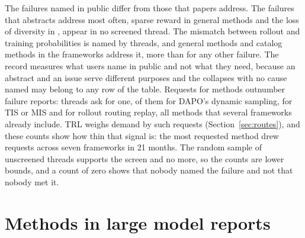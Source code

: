 \documentclass{article}
\begin{document}
\begin{table}[!htbp]
\centering
\small
\caption{\textbf{Training failures in the frameworks' issues against the methods that address them.} Unit: thread in the first column, general method in the next two, catalog method in the last. Issue threads are issues and discussions opened since January 2025 with an opening post that reports the failure. General methods naming the failure are the pool's general methods with an abstract that names it, with the number of those that at least one framework includes. Catalog methods are those addressing the failure that at least one framework includes. The two rows with dashes are failures outside the catalog's list.}
\label{tab:demand}

\end{table}

The failures named in public differ from those that papers address. The failures that abstracts address most often, sparse reward in \NSupplySparseReward{} general methods and the loss of diversity in \NSupplyDiversityLoss{}, appear in no screened thread. The mismatch between rollout and training probabilities is named by \NIssueTrainInferMismatch{} threads, and \NSupplyTrainInferMismatch{} general methods and \NCatalogTrainInferMismatch{} catalog methods in the frameworks address it, more than for any other failure. The record measures what users name in public and not what they need, because an abstract and an issue serve different purposes and the \NIssueInstability{} collapses with no cause named may belong to any row of the table. Requests for methods outnumber failure reports: \NIssueRequest{} threads ask for one, \NReqDynamicSampling{} of them for DAPO's dynamic sampling, \NReqMismatch{} for TIS or MIS and \NReqRoutingReplay{} for rollout routing replay, all methods that several frameworks already include. TRL weighs demand by such requests (Section~\ref{sec:routes}), and these counts show how thin that signal is: the most requested method drew \NReqDynamicSampling{} requests across seven frameworks in 21 months. The random sample of \NIssueRecall{} unscreened threads supports the screen and no more, so the counts are lower bounds, and a count of zero shows that nobody named the failure and not that nobody met it.

\section{Methods in large model reports}
\label{sec:use}
\end{document}
